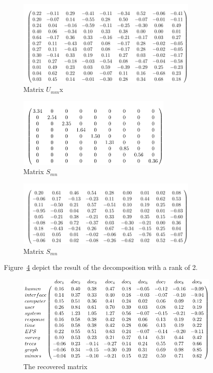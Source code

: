 \begin{figure}[h!]
	\centering
	\includegraphics[width=0.8\textwidth]{images/UmmMatrix.pdf}
	\caption{Matrix $U_{mm}$x}
	\label{fig:UmmMatrix}
\end{figure}


\begin{figure}[h!]
	\centering
	\includegraphics[width=0.68\textwidth]{images/SmnMatrix.pdf}
		\caption{Matrix $S_{mn}$}
	\label{fig:SmnMatrix}
\end{figure}


\begin{figure}[h!]
	\centering
	\includegraphics[width=0.8\textwidth]{images/VmnMatrix.pdf}
	\caption{Matrix $S_{mn}$}
	\label{fig:VmnMatrix}
\end{figure}

Figure~\ref{fig:DecomposedMatrix} depict the result of the decomposition with a rank of 2.

\begin{figure}[h!]
	\centering
	\includegraphics[width=0.9\textwidth]{images/DecomposedMatrix.pdf}
	\caption{The recovered matrix}
	\label{fig:DecomposedMatrix}
\end{figure}






